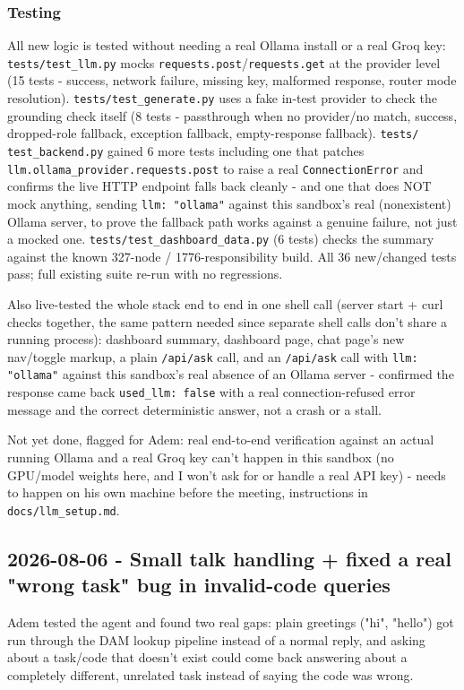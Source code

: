 \subsubsection*{Testing}
All new logic is tested without needing a real Ollama install or a real Groq key: \texttt{tests/\allowbreak{}test\_\allowbreak{}llm.py} mocks \texttt{requests.post}/\texttt{requests.get} at the provider level (15 tests - success, network failure, missing key, malformed response, router mode resolution). \texttt{tests/\allowbreak{}test\_\allowbreak{}generate.py} uses a fake in-test provider to check the grounding check itself (8 tests - passthrough when no provider/no match, success, dropped-role fallback, exception fallback, empty-response fallback). \texttt{tests/\allowbreak{} test\_\allowbreak{}backend.py} gained 6 more tests including one that patches \texttt{llm.ollama\_\allowbreak{}provider.requests.post} to raise a real \texttt{ConnectionError} and confirms the live HTTP endpoint falls back cleanly - and one that does NOT mock anything, sending \texttt{llm: "ollama"} against this sandbox's real (nonexistent) Ollama server, to prove the fallback path works against a genuine failure, not just a mocked one. \texttt{tests/\allowbreak{}test\_\allowbreak{}dashboard\_\allowbreak{}data.py} (6 tests) checks the summary against the known 327-node / 1776-responsibility build. All 36 new/changed tests pass; full existing suite re-run with no regressions.

Also live-tested the whole stack end to end in one shell call (server start + curl checks together, the same pattern needed since separate shell calls don't share a running process): dashboard summary, dashboard page, chat page's new nav/toggle markup, a plain \texttt{/\allowbreak{}api/\allowbreak{}ask} call, and an \texttt{/\allowbreak{}api/\allowbreak{}ask} call with \texttt{llm: "ollama"} against this sandbox's real absence of an Ollama server - confirmed the response came back \texttt{used\_\allowbreak{}llm: false} with a real connection-refused error message and the correct deterministic answer, not a crash or a stall.

Not yet done, flagged for Adem: real end-to-end verification against an actual running Ollama and a real Groq key can't happen in this sandbox (no GPU/model weights here, and I won't ask for or handle a real API key) - needs to happen on his own machine before the meeting, instructions in \texttt{docs/\allowbreak{}llm\_\allowbreak{}setup.md}.

\subsection*{2026-08-06 - Small talk handling + fixed a real "wrong task" bug in invalid-code queries}
Adem tested the agent and found two real gaps: plain greetings ("hi", "hello") got run through the DAM lookup pipeline instead of a normal reply, and asking about a task/code that doesn't exist could come back answering about a completely different, unrelated task instead of saying the code was wrong.

